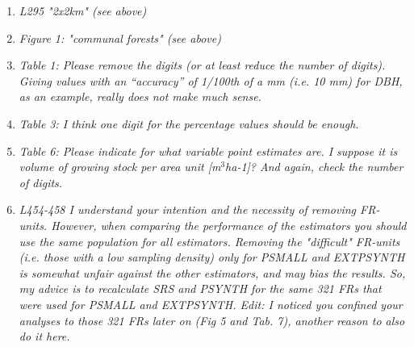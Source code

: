 \documentclass{article}
\begin{document}
\begin{enumerate}
  \item \textit{L295 "2x2km" (see above)}
  
  
  \item \textit{Figure 1: "communal forests" (see above)}
  
  
  \item \textit{Table 1: Please remove the digits (or at least reduce the number of digits). Giving values with an “accuracy” of 1/100th of a mm (i.e. 10 mm) for DBH, as an example, really does not make much sense. }
  
  
  \item \textit{Table 3: I think one digit for the percentage values should be enough.}
  
  
  \item \textit{Table 6: Please indicate for what variable point estimates are. I suppose it is volume of growing stock per area unit [m$^3$ha-1]? And again, check the number of digits.}
  
  
  \item \textit{L454-458 I understand your intention and the necessity of removing FR-units. However, when comparing the performance of the estimators you should use the same population for all estimators. Removing the "difficult" FR-units (i.e. those with a low sampling density) only for PSMALL and EXTPSYNTH is somewhat unfair against the other estimators, and may bias the results. So, my advice is to recalculate SRS and PSYNTH for the same 321 FRs that were used for PSMALL and EXTPSYNTH. Edit: I noticed you confined your analyses to those 321 FRs later on (Fig 5 and Tab. 7), another reason to also do it here.}
  

\end{enumerate}
\end{document}
